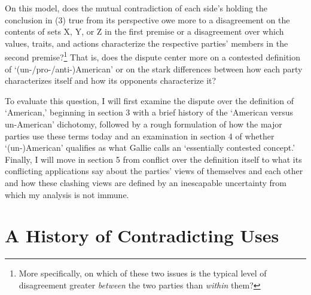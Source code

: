 On this model, does the mutual contradiction of each side's holding the
conclusion in (3) true from its perspective owe more to a disagreement
on the contents of sets X, Y, or Z in the first premise or a
disagreement over which values, traits, and actions characterize the
respective parties' members in the second premise?\footnote{More
  specifically, on which of these two issues is the typical level of
  disagreement greater \emph{between} the two parties than \emph{within}
  them?} That is, does the dispute center more on a contested definition
of `(un-/pro-/anti-)American' or on the stark differences between how
each party characterizes itself and how its opponents characterize it?

To evaluate this question, I will first examine the dispute over the
definition of `American,' beginning in section 3 with a brief history of
the `American versus un-American' dichotomy, followed by a rough
formulation of how the major parties use these terms today and an
examination in section 4 of whether `(un-)American' qualifies as what
Gallie calls an `essentially contested concept.' Finally, I will move in
section 5 from conflict over the definition itself to what its
conflicting applications say about the parties' views of themselves and
each other and how these clashing views are defined by an inescapable
uncertainty from which my analysis is not immune.

\section{A History of Contradicting
Uses}\label{a-history-of-contradicting-uses}

